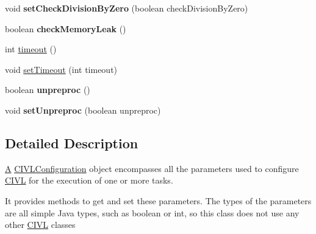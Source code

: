 \begin{DoxyCompactItemize}
\item 
\hypertarget{classedu_1_1udel_1_1cis_1_1vsl_1_1civl_1_1config_1_1IF_1_1CIVLConfiguration_a58ce2809c3b888295e2779d3076b3dda}{}void {\bfseries set\+Check\+Division\+By\+Zero} (boolean check\+Division\+By\+Zero)\label{classedu_1_1udel_1_1cis_1_1vsl_1_1civl_1_1config_1_1IF_1_1CIVLConfiguration_a58ce2809c3b888295e2779d3076b3dda}

\item 
\hypertarget{classedu_1_1udel_1_1cis_1_1vsl_1_1civl_1_1config_1_1IF_1_1CIVLConfiguration_a4c8a59c24cf796779027b4c96ece1371}{}boolean {\bfseries check\+Memory\+Leak} ()\label{classedu_1_1udel_1_1cis_1_1vsl_1_1civl_1_1config_1_1IF_1_1CIVLConfiguration_a4c8a59c24cf796779027b4c96ece1371}

\item 
int \hyperlink{classedu_1_1udel_1_1cis_1_1vsl_1_1civl_1_1config_1_1IF_1_1CIVLConfiguration_a553735567997487bcef595ab6f7c0f6b}{timeout} ()
\item 
void \hyperlink{classedu_1_1udel_1_1cis_1_1vsl_1_1civl_1_1config_1_1IF_1_1CIVLConfiguration_a706e5dd96777006abd8eca595b048216}{set\+Timeout} (int timeout)
\item 
\hypertarget{classedu_1_1udel_1_1cis_1_1vsl_1_1civl_1_1config_1_1IF_1_1CIVLConfiguration_a028cddad5b8860ec00ee91f4eba06935}{}boolean {\bfseries unpreproc} ()\label{classedu_1_1udel_1_1cis_1_1vsl_1_1civl_1_1config_1_1IF_1_1CIVLConfiguration_a028cddad5b8860ec00ee91f4eba06935}

\item 
\hypertarget{classedu_1_1udel_1_1cis_1_1vsl_1_1civl_1_1config_1_1IF_1_1CIVLConfiguration_af77f55c1f59447fd730531fabac4a245}{}void {\bfseries set\+Unpreproc} (boolean unpreproc)\label{classedu_1_1udel_1_1cis_1_1vsl_1_1civl_1_1config_1_1IF_1_1CIVLConfiguration_af77f55c1f59447fd730531fabac4a245}

\end{DoxyCompactItemize}


\subsection{Detailed Description}
\hyperlink{structA}{A} \hyperlink{classedu_1_1udel_1_1cis_1_1vsl_1_1civl_1_1config_1_1IF_1_1CIVLConfiguration}{C\+I\+V\+L\+Configuration} object encompasses all the parameters used to configure \hyperlink{classedu_1_1udel_1_1cis_1_1vsl_1_1civl_1_1CIVL}{C\+I\+V\+L} for the execution of one or more tasks. 

It provides methods to get and set these parameters. The types of the parameters are all simple Java types, such as boolean or int, so this class does not use any other \hyperlink{classedu_1_1udel_1_1cis_1_1vsl_1_1civl_1_1CIVL}{C\+I\+V\+L} classes

